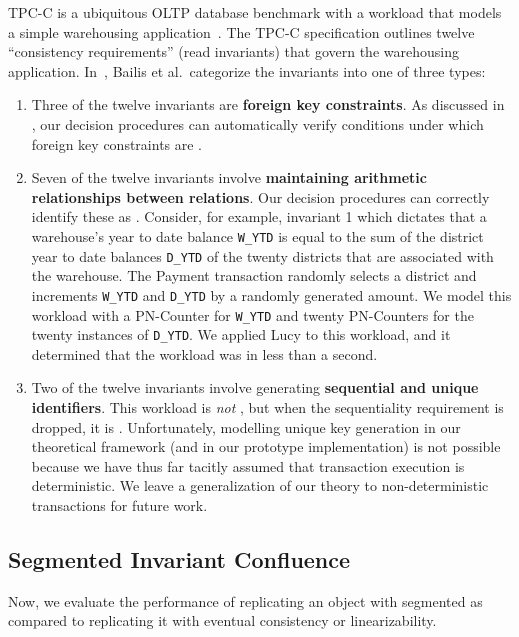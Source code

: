 \example[TPC-C]
TPC-C is a ubiquitous OLTP database benchmark with a workload that models a
simple warehousing application~\cite{difallah2013oltp}. The TPC-C specification
outlines twelve ``consistency requirements'' (read invariants) that govern the
warehousing application. In~\cite{bailis2014coordination}, Bailis et al.\
categorize the invariants into one of three types:
\begin{enumerate}
  \item
    Three of the twelve invariants are \textbf{foreign key constraints}.  As
    discussed in \exampleref{ForeignKeysEval}, our decision procedures can
    automatically verify conditions under which foreign key constraints are
    \invariantconfluent{}.

  \item
    \newcommand{\ttt}[1]{{\smaller \texttt{#1}}}
    Seven of the twelve invariants involve \textbf{maintaining arithmetic
    relationships between relations}. Our decision procedures can correctly
    identify these as \invariantconfluent{}. Consider, for example, invariant 1
    which dictates that a warehouse's year to date balance \ttt{W\_YTD} is
    equal to the sum of the district year to date balances \ttt{D\_YTD} of the
    twenty districts that are associated with the warehouse. The Payment
    transaction randomly selects a district and increments \ttt{W\_YTD} and
    \ttt{D\_YTD} by a randomly generated amount. We model this workload with a
    PN-Counter for \ttt{W\_YTD} and twenty PN-Counters for the twenty instances
    of \ttt{D\_YTD}. We applied Lucy to this workload, and it determined that
    the workload was \invariantconfluent{} in less than a second.

  \item
    Two of the twelve invariants involve generating \textbf{sequential and
    unique identifiers}. This workload is \emph{not} \invariantconfluent{}, but
    when the sequentiality requirement is dropped, it is \invariantconfluent{}.
    Unfortunately, modelling unique key generation in our theoretical framework
    (and in our prototype implementation) is not possible because we have thus
    far tacitly assumed that transaction execution is deterministic. We leave a
    generalization of our theory to non-deterministic transactions for future
    work.
\end{enumerate}

\subsection{Segmented Invariant Confluence}%
Now, we evaluate the performance of replicating an object with segmented
\invariantconfluence{} as compared to replicating it with eventual consistency or
linearizability.

